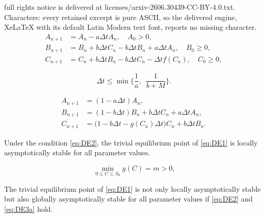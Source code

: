 \documentclass[10pt,a4paper]{amsart}
\begin{document}
full rights notice is delivered at licenses/arxiv-2606.30439-CC-BY-4.0.txt. Characters: every retained excerpt is pure ASCII, so the delivered engine, XeLaTeX with its default Latin Modern text font, reports no missing character.
\begin{equation}\label{eq:DE1}
\begin{split}
A_{n + 1} &= A_n  -a\Delta t A_n, \quad A_0 > 0,\\
B_{n+1} &= B_n + b\Delta t C_n - b\Delta t B_n + a\Delta t A_n,\quad B_0 \geq 0,\\
C_{n + 1} &= C_n +  b\Delta t B_n- b\Delta t C_n- \Delta tf(C_n), \quad C_0 \geq 0,
\end{split}
\end{equation}

\begin{equation}\label{eq:DE2}
\Delta t \leq \min\bigg\{\dfrac{1}{a},\,\,\,\dfrac{1}{b + M}\bigg\}.
\end{equation}

\begin{equation}\label{eq:DE7}
\begin{split}
A_{n + 1} &= (1 -a\Delta t) A_n,\\
B_{n+1} &= (1 - b\Delta t)B_n + b\Delta t C_n + a\Delta t A_n,\\
C_{n + 1} &= \big(1 - b\Delta t - g(C_n)\Delta t\big)C_n +  b\Delta t B_n.
\end{split}
\end{equation}

\begin{theorem}\label{Theorem5}
Under the condition \eqref{eq:DE2}, the trivial equilibrium point of \eqref{eq:DE1} is locally asymptotically stable for all parameter values.
\end{theorem}

\begin{equation}\label{eq:DE3a}\
\min_{0 \leq C \leq S_0}g(C) = m > 0,
\end{equation}

\begin{theorem}\label{Theorem5new}
The trivial equilibrium point of \eqref{eq:DE1} is not only locally asymptotically stable but also globally asymptotically stable for all parameter values if \eqref{eq:DE2} and \eqref{eq:DE3a} hold.
\end{theorem}
\end{document}
